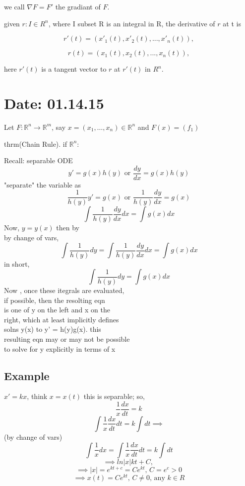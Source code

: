 \documentclass[10pt,a4paper]{article}
\begin{document}
  we call $\nabla F = F'$ 
  the gradiant of $F$.

  given $r : I \in R^n$, where I subset R is an integral 
  in R, the derivative of $r$ at t is 

  $$ r'(t) = (x'_1(t), x'_2(t), ... , x'_n(t)),$$ 

  $$ r(t) = (x_1(t), x_2(t), ... , x_n(t)),$$

  here $r'(t)$ is a tangent vector to $r$ at 
  $r'(t)$ in $R^n$.

\section{Date: 01.14.15}

  Let \( F: \mathbb{R}^n \to \mathbb{R}^m \), say \( x = (x_1, \dots ,
  x_n) \in \mathbb{R}^n  \) and \( F(x) = (f_1) \)

  thrm(Chain Rule). if \( \mathbb{R}^n \): 

  \newpage
Recall: separable ODE
$$y' = g(x)h(y) \text{ or } \frac{dy}{dx} = g(x)h(y)$$
"separate" the variable as \\
$$\frac{1}{h(y)} y' = g(x) \text{ or }  \frac{1}{h(y)}\frac{dy}{dx} =g(x)$$
$$\int\frac{1}{h(y)} \frac{dy}{dx} dx = \int g(x)dx$$
Now, $y = y(x)$ then by  \\
by change of vars,  \\
$$\int \frac{1}{h(y)} dy = \int \frac{1}{h(y)} \frac{dy}{dx} dx = \int g(x)dx $$
in short,  \\
$$\int \frac{1}{h(y)} dy = \int g(x)dx$$
Now , once these itegrals are evaluated, \\
if possible, then the resolting eqn \\
is one of y on the left and x on the \\
right, which at least implicitly defines  \\
solns y(x) to y' = h(y)g(x). this  \\
resulting eqn may or may not be possible  \\
to solve for y explicitly in terms of x \\

\subsection*{Example}
$x'=kx$, think $x=x(t)$
this is separable; so, 
$$\frac{1}{x} \frac{dx}{dt} = k$$
$$\int \frac{1}{x} \frac{dx}{dt} dt = k \int dt \implies $$
(by change of vars)
$$\int \frac{1}{x} dx = \int \frac{1}{x} \frac{dx}{dt} dt = k\int dt$$
$$\implies ln|x| kt + C \text{, }$$ 
$$\implies |x| = e^{kt+c} = Ce^{kt} \text{, } C=e^c >0$$  
$$\implies x(t) = Ce^{kt}\text{, } C  \neq 0\text{, any }k \in R$$ 
\end{document}
